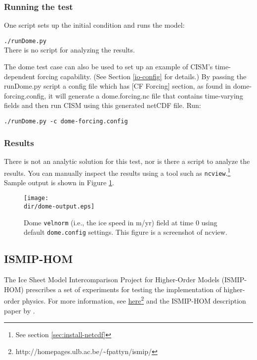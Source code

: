 \subsubsection{Running the test}
One script sets up the initial condition and runs the model:

\texttt{./runDome.py}\\

\noindent
There is no script for analyzing the results.

\par
The dome test case can also be used to set up an example of CISM's time-dependent
forcing capability.  (See Section \ref{io-config} for details.) By passing the runDome.py script a config file which has [CF Forcing] section, as found in dome-forcing.config,
it will generate a dome.forcing.nc file that contains time-varying fields and then run CISM using this generated netCDF file. Run:


\texttt{./runDome.py -c dome-forcing.config}\\


\subsubsection{Results}
There is not an analytic solution for this test, nor is there a script to analyze
the results.  You can manually inspect the results using a tool such as \texttt{ncview}.\footnote{See section \ref{sec:install-netcdf}}
Sample output is shown in Figure \ref{fig:domeresults}.
\begin{figure}[H!]
	\centering
	\texttt{[image: \\dir/dome-output.eps]}
	\caption{Dome \texttt{velnorm} (i.e., the ice speed in m/yr) field at time 0 using default \texttt{dome.config} settings. This figure is a screenshot of ncview.}
	\label{fig:domeresults}
\end{figure}
\FloatBarrier

\subsection{ISMIP-HOM}
The Ice Sheet Model Intercomparison Project for Higher-Order Models (ISMIP-HOM)
prescribes a set of experiments for testing the implementation of higher-order physics.  
For more information, see 
\href{http://homepages.ulb.ac.be/~fpattyn/ismip/}{here}\footnote{http://homepages.ulb.ac.be/\textasciitilde{}fpattyn/ismip/} 
and the ISMIP-HOM description paper by \citet{Pattyn2008}.

